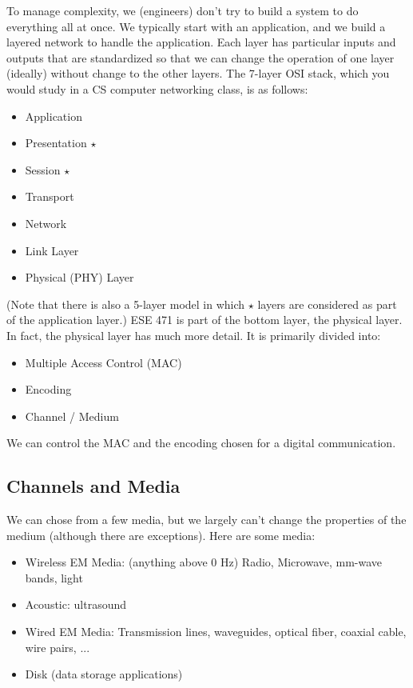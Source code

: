 To manage complexity, we (engineers) don't try to build a system to do everything all at once.  We typically start with an application, and we build a layered network to handle the application.  Each layer has particular inputs and outputs that are standardized so that we can change the operation of one layer (ideally) without change to the other layers.  The 7-layer OSI stack, which you would study in a CS computer networking class, is as follows:
\begin{itemize}
  \item Application
  \item Presentation $\star$
  \item Session $\star$
  \item Transport
  \item Network
  \item Link Layer
  \item Physical (PHY) Layer
\end{itemize}
(Note that there is also a 5-layer model in which $\star$ layers are
considered as part of the application layer.)  ESE 471 is part of
the bottom layer, the physical layer. In fact, the physical layer
has much more detail. It is primarily divided into:
\begin{itemize}
  \item Multiple Access Control (MAC)
  \item Encoding
  \item Channel / Medium
\end{itemize}
We can control the MAC and the encoding chosen for a digital
communication.

\subsection{Channels and Media}

We can chose from a few media, but we largely can't change the
properties of the medium (although there are exceptions). Here are
some media:
\begin{itemize}
  \item Wireless EM Media: (anything above 0 Hz) Radio, Microwave, mm-wave
  bands, light
  \item Acoustic:  ultrasound
  \item Wired EM Media: Transmission lines, waveguides, optical fiber, coaxial
  cable, wire pairs, ...
  \item Disk (data storage applications)
\end{itemize}

